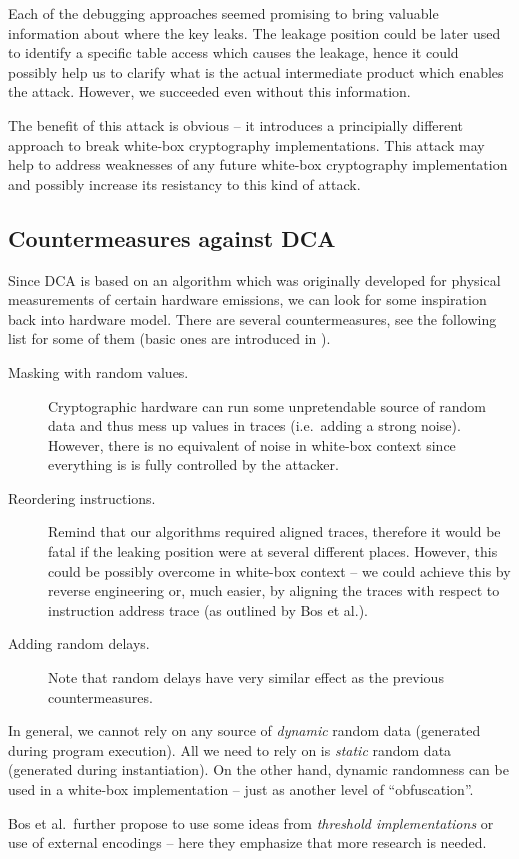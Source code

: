 Each of the debugging approaches seemed promising to bring valuable information about where the key leaks. The leakage position could be later used to identify a specific table access which causes the leakage, hence it could possibly help us to clarify what is the actual intermediate product which enables the attack. However, we succeeded even without this information.

The benefit of this attack is obvious -- it introduces a principially different approach to break white-box cryptography implementations. This attack may help to address weaknesses of any future white-box cryptography implementation and possibly increase its resistancy to this kind of attack.



\subsection{Countermeasures against DCA}

Since DCA is based on an algorithm which was originally developed for physical measurements of certain hardware emissions, we can look for some inspiration back into hardware model. There are several countermeasures, see the following list for some of them (basic ones are introduced in \cite{chari1999towards,goubin1999des}).
\begin{description}
	\item[Masking with random values.] Cryptographic hardware can run some unpretendable source of random data and thus mess up values in traces (i.e.\ adding a strong noise). However, there is no equivalent of noise in white-box context since everything is is fully controlled by the attacker.
	\item[Reordering instructions.] Remind that our algorithms required aligned traces, therefore it would be fatal if the leaking position were at several different places. However, this could be possibly overcome in white-box context -- we could achieve this by reverse engineering or, much easier, by aligning the traces with respect to instruction address trace (as outlined by Bos et al.).
	\item[Adding random delays.] Note that random delays have very similar effect as the previous countermeasures.
\end{description}
In general, we cannot rely on any source of {\em dynamic} random data (generated during program execution). All we need to rely on is {\em static} random data (generated during instantiation). On the other hand, dynamic randomness can be used in a white-box implementation -- just as another level of ``obfuscation''.

Bos et al.\ further propose to use some ideas from {\em threshold implementations} \cite{nikova2006threshold} or use of external encodings -- here they emphasize that more research is needed.
